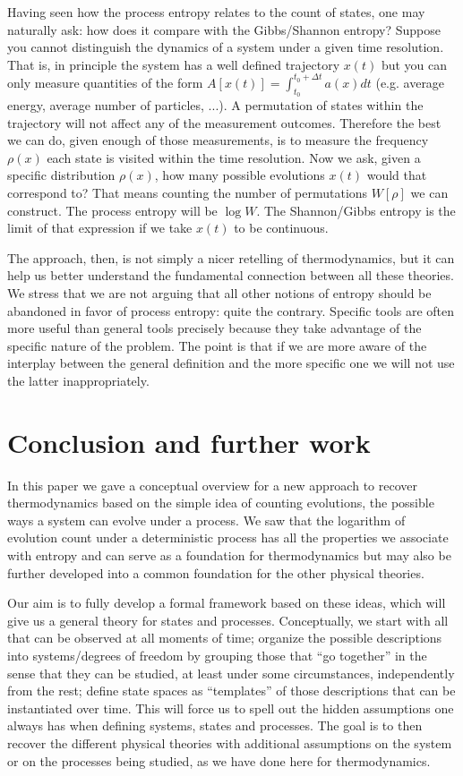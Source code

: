 \documentclass[letterpaper,twocolumn]{article}
\begin{document}
Having seen how the process entropy relates to the count of states, one may naturally ask: how does it compare with the Gibbs/Shannon entropy? Suppose you cannot distinguish the dynamics of a system under a given time resolution. That is, in principle the system has a well defined trajectory $x(t)$ but you can only measure quantities of the form $A[x(t)] = \int_{t_0}^{t_0 + \Delta t} a(x) dt$ (e.g. average energy, average number of particles, ...). A permutation of states within the trajectory will not affect any of the measurement outcomes. Therefore the best we can do, given enough of those measurements, is to measure the frequency $\rho(x)$ each state is visited within the time resolution. Now we ask, given a specific distribution $\rho(x)$, how many possible evolutions $x(t)$ would that correspond to? That means counting the number of permutations $W[\rho]$ we can construct. The process entropy will be $\log W$. The Shannon/Gibbs entropy is the limit of that expression if we take $x(t)$ to be continuous.

The approach, then, is not simply a nicer retelling of thermodynamics, but it can help us better understand the fundamental connection between all these theories. We stress that we are not arguing that all other notions of entropy should be abandoned in favor of process entropy: quite the contrary. Specific tools are often more useful than general tools precisely because they take advantage of the specific nature of the problem. The point is that if we are more aware of the interplay between the general definition and the more specific one we will not use the latter inappropriately.

\section{Conclusion and further work}

In this paper we gave a conceptual overview for a new approach to recover thermodynamics based on the simple idea of counting evolutions, the possible ways a system can evolve under a process. We saw that the logarithm of evolution count under a deterministic process has all the properties we associate with entropy and can serve as a foundation for thermodynamics but may also be further developed into a common foundation for the other physical theories.

Our aim is to fully develop a formal framework based on these ideas, which will give us a general theory for states and processes. Conceptually, we start with all that can be observed at all moments of time; organize the possible descriptions into systems/degrees of freedom by grouping those that ``go together'' in the sense that they can be studied, at least under some circumstances, independently from the rest; define state spaces as ``templates'' of those descriptions that can be instantiated over time. This will force us to spell out the hidden assumptions one always has when defining systems, states and processes. The goal is to then recover the different physical theories with additional assumptions on the system or on the processes being studied, as we have done here for thermodynamics.
\end{document}
